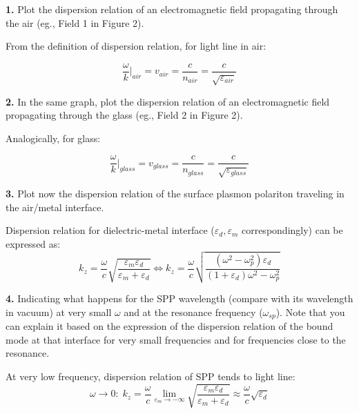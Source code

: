\documentclass[11pt,a4paper]{article}
\begin{document}
\begin{displayquote}
\textbf{1.}  Plot the dispersion relation of an electromagnetic field
propagating through the air (eg., Field 1 in Figure 2).
\end{displayquote}
From the definition of dispersion relation, for light line in air: 

\begin{equation}
    \frac{\omega}{k}\Big|_{air}=v_{air}=\frac{c}{n_{air}}=\frac{c}{\sqrt{\varepsilon_{air}}}
\end{equation}


\begin{displayquote}
\textbf{2.}  In the same graph, plot the dispersion relation of an electromagnetic field propagating through the glass (eg., Field 2 in Figure 2).
\end{displayquote}

Analogically, for glass:

\begin{equation}
     \frac{\omega}{k}\Big|_{glass}=v_{glass}=\frac{c}{n_{glass}}=\frac{c}{\sqrt{\varepsilon_{glass}}}
\end{equation}

\begin{displayquote}
\textbf{3.}  Plot now the dispersion relation of the surface plasmon polariton traveling in the air/metal interface.
\end{displayquote}
Dispersion relation for dielectric-metal interface ($\varepsilon_d, \varepsilon_m$ correspondingly) can be expressed as:
\begin{equation}
    k_z=\frac{\omega}{c}\sqrt{\frac{\varepsilon_m \varepsilon_d}{\varepsilon_m + \varepsilon_d}} \Leftrightarrow k_z = \frac{\omega}{c}\sqrt{\frac{(\omega^2-\omega^2_p) \varepsilon_d}{(1+\varepsilon_d) \omega^2 - \omega^2_p}}
\end{equation}

\begin{displayquote}
    \textbf{4.}  Indicating what happens for the SPP wavelength (compare with its
wavelength in vacuum) at very small $\omega$ and at the resonance frequency ($\omega_{sp}$). Note that you can explain it based on the expression of the dispersion relation of the bound mode at that interface for very small frequencies and for frequencies close to the resonance.
\end{displayquote}
At very low frequency, dispersion relation of SPP tends to light line:
\begin{equation}
    \omega \to 0: \; k_z=\frac{\omega}{c} \lim_{\varepsilon_m \to -\infty} \sqrt{\frac{\varepsilon_m \varepsilon_d}{\varepsilon_m + \varepsilon_d}} \approx \frac{\omega}{c} \sqrt{\varepsilon_d}
\end{equation}
\end{document}
